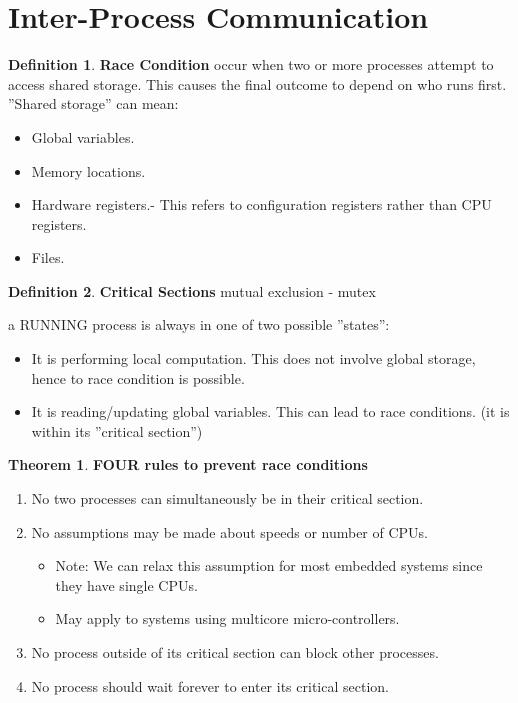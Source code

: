 \documentclass[12pt,a4paper]{article}
\theoremstyle{definition}
\newtheorem{theorem}{Theorem}[section]
\newtheorem{definition}{Definition}[section]
\newenvironment{myitemize}
{ \begin{itemize}
    \setlength{\itemsep}{5pt}
    \setlength{\parskip}{0pt}
    \setlength{\parsep}{0pt}     }
{ \end{itemize}                  }
\newenvironment{myenumerate}
{ \begin{enumerate}
    \setlength{\itemsep}{5pt}
    \setlength{\parskip}{0pt}
    \setlength{\parsep}{0pt}     }
{ \end{enumerate}                }
\begin{document}
\section{Inter-Process Communication}
\begin{definition}{\textbf{Race Condition}}
	occur when two or more processes attempt to access shared storage. This causes the final outcome to depend on who runs first. ''Shared storage'' can mean:
	\begin{myitemize}
		\item Global variables.
		\item Memory locations.
		\item Hardware registers.- This refers to configuration registers rather than CPU registers.
		\item Files.
	\end{myitemize}
\end{definition}

\begin{definition}{\textbf{Critical Sections} mutual exclusion - \textsf{mutex}}
	
	a RUNNING process is always in one of two possible ''states'':
	\begin{myitemize}
		\item It is performing local computation. This does not involve global storage, hence to race condition is possible.
		\item It is reading/updating global variables. This can lead to race conditions. (it is within its ''critical section'')
	\end{myitemize}
\end{definition}

\begin{theorem}{\textbf{FOUR rules to prevent race conditions}}
	\begin{myenumerate}
		\item No two processes can simultaneously be in their critical section.
		\item No assumptions may be made about speeds or number of CPUs.
		\begin{myitemize}
			\item Note: We can relax this assumption for most embedded systems since they have single CPUs.
			\item May apply to systems using multicore micro-controllers.
		\end{myitemize}
		\item No process outside of its critical section can block other processes.
		\item No process should wait forever to enter its critical section.
	\end{myenumerate}
\end{theorem}
\end{document}
